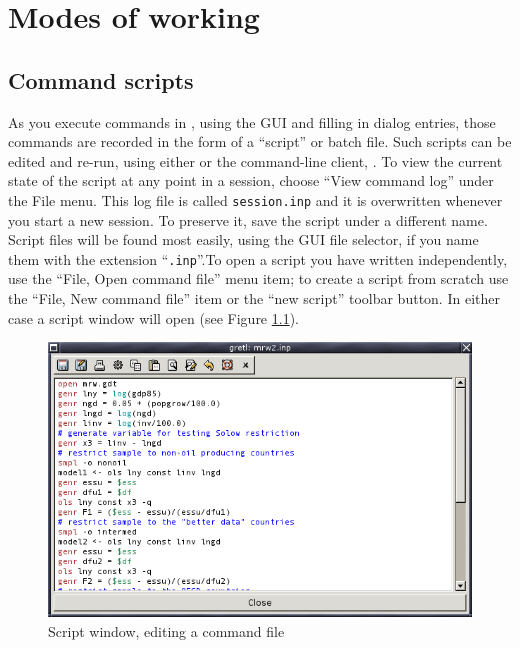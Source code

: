 \chapter{Modes of working}
\label{modes}



\section{Command scripts}
\label{scripts}


      As you execute commands in ,
      using the GUI and filling in dialog entries, those commands are
      recorded in the form of a ``script'' or batch file.
      Such scripts can be edited and re-run, using either
       or the command-line client,
      .
      To view the current state of the script at any point in a
       session, choose ``View
	command log'' under the File menu. This log file is
      called \verb+session.inp+ and it is overwritten
      whenever you start a new session.  To preserve it, save the
      script under a different name.  Script files will be found most
      easily, using the GUI file selector, if you name them with the
      extension ``\verb+.inp+''.To open a script you have written independently, use the
      ``File, Open command file'' menu item; to create a
      script from scratch use the ``File, New command
	file'' item or the ``new script'' toolbar
      button.  In either case a script window will open (see Figure \ref{fig-scriptwin}).
\begin{figure}[htbp]
\caption{Script window, editing a command file}
\label{fig-scriptwin}
\begin{center}
\includegraphics[scale=0.5]{figures/scriptwin}
\end{center}
\end{figure}
